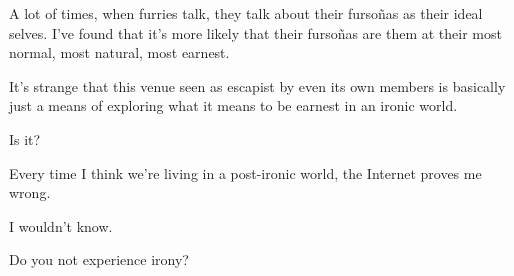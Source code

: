 A lot of times, when furries talk, they talk about their fursoñas as their ideal selves. I've found that it's more likely that their fursoñas are them at their most normal, most natural, most earnest.

It's strange that this venue seen as escapist by even its own members is basically just a means of exploring what it means to be earnest in an ironic world.

\begin{ally}
Is it?
\end{ally}
Every time I think we're living in a post-ironic world, the Internet proves me wrong.

\begin{ally}
I wouldn't know.
\end{ally}
Do you not experience irony?

